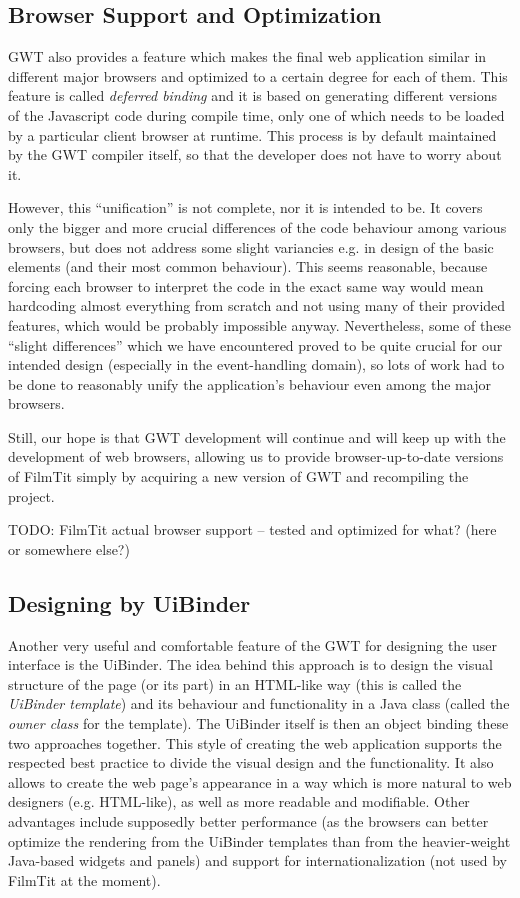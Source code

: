
\subsection{Browser Support and Optimization}
GWT also provides a feature which makes the final web application similar in different major browsers and optimized to a certain degree for each of them. This feature is called {\em deferred binding} and it is based on generating different versions of the Javascript code during compile time, only one of which needs to be loaded by a particular client browser at runtime. This process is by default maintained by the GWT compiler itself, so that the developer does not have to worry about it.

However, this ``unification'' is not complete, nor it is intended to be. It covers only the bigger and more crucial differences of the code behaviour among various browsers, but does not address some slight variancies e.g. in design of the basic elements (and their most common behaviour). This seems reasonable, because forcing each browser to interpret the code in the exact same way would mean hardcoding almost everything from scratch and not using many of their provided features, which would be probably impossible anyway. Nevertheless, some of these ``slight differences'' which we have encountered proved to be quite crucial for our intended design (especially in the event-handling domain), so lots of work had to be done to reasonably unify the application's behaviour even among the major browsers.

Still, our hope is that GWT development will continue and will keep up with the development of web browsers, allowing us to provide browser-up-to-date versions of FilmTit simply by acquiring a new version of GWT and recompiling the project.

TODO: FilmTit actual browser support -- tested and optimized for what? (here or somewhere else?)

\subsection{Designing by UiBinder}
Another very useful and comfortable feature of the GWT for designing the user interface is the UiBinder. The idea behind this approach is to design the visual structure of the page (or its part) in an HTML-like way (this is called the {\em UiBinder template}) and its behaviour and functionality in a Java class (called the {\em owner class} for the template). The UiBinder itself is then an object binding these two approaches together. This style of creating the web application supports the respected best practice to divide the visual design and the functionality. It also allows to create the web page's appearance in a way which is more natural to web designers (e.g. HTML-like), as well as more readable and modifiable. Other advantages include supposedly better performance (as the browsers can better optimize the rendering from the UiBinder templates than from the heavier-weight Java-based widgets and panels) and support for internationalization (not used by FilmTit at the moment).

